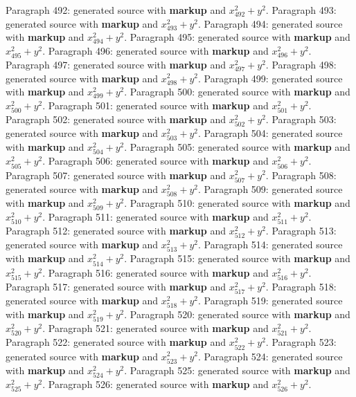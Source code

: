 \documentclass{article}
\begin{document}
Paragraph 492: generated source with \textbf{markup} and $x_{492}^2 + y^2$.
Paragraph 493: generated source with \textbf{markup} and $x_{493}^2 + y^2$.
Paragraph 494: generated source with \textbf{markup} and $x_{494}^2 + y^2$.
Paragraph 495: generated source with \textbf{markup} and $x_{495}^2 + y^2$.
Paragraph 496: generated source with \textbf{markup} and $x_{496}^2 + y^2$.
Paragraph 497: generated source with \textbf{markup} and $x_{497}^2 + y^2$.
Paragraph 498: generated source with \textbf{markup} and $x_{498}^2 + y^2$.
Paragraph 499: generated source with \textbf{markup} and $x_{499}^2 + y^2$.
Paragraph 500: generated source with \textbf{markup} and $x_{500}^2 + y^2$.
Paragraph 501: generated source with \textbf{markup} and $x_{501}^2 + y^2$.
Paragraph 502: generated source with \textbf{markup} and $x_{502}^2 + y^2$.
Paragraph 503: generated source with \textbf{markup} and $x_{503}^2 + y^2$.
Paragraph 504: generated source with \textbf{markup} and $x_{504}^2 + y^2$.
Paragraph 505: generated source with \textbf{markup} and $x_{505}^2 + y^2$.
Paragraph 506: generated source with \textbf{markup} and $x_{506}^2 + y^2$.
Paragraph 507: generated source with \textbf{markup} and $x_{507}^2 + y^2$.
Paragraph 508: generated source with \textbf{markup} and $x_{508}^2 + y^2$.
Paragraph 509: generated source with \textbf{markup} and $x_{509}^2 + y^2$.
Paragraph 510: generated source with \textbf{markup} and $x_{510}^2 + y^2$.
Paragraph 511: generated source with \textbf{markup} and $x_{511}^2 + y^2$.
Paragraph 512: generated source with \textbf{markup} and $x_{512}^2 + y^2$.
Paragraph 513: generated source with \textbf{markup} and $x_{513}^2 + y^2$.
Paragraph 514: generated source with \textbf{markup} and $x_{514}^2 + y^2$.
Paragraph 515: generated source with \textbf{markup} and $x_{515}^2 + y^2$.
Paragraph 516: generated source with \textbf{markup} and $x_{516}^2 + y^2$.
Paragraph 517: generated source with \textbf{markup} and $x_{517}^2 + y^2$.
Paragraph 518: generated source with \textbf{markup} and $x_{518}^2 + y^2$.
Paragraph 519: generated source with \textbf{markup} and $x_{519}^2 + y^2$.
Paragraph 520: generated source with \textbf{markup} and $x_{520}^2 + y^2$.
Paragraph 521: generated source with \textbf{markup} and $x_{521}^2 + y^2$.
Paragraph 522: generated source with \textbf{markup} and $x_{522}^2 + y^2$.
Paragraph 523: generated source with \textbf{markup} and $x_{523}^2 + y^2$.
Paragraph 524: generated source with \textbf{markup} and $x_{524}^2 + y^2$.
Paragraph 525: generated source with \textbf{markup} and $x_{525}^2 + y^2$.
Paragraph 526: generated source with \textbf{markup} and $x_{526}^2 + y^2$.
\end{document}
